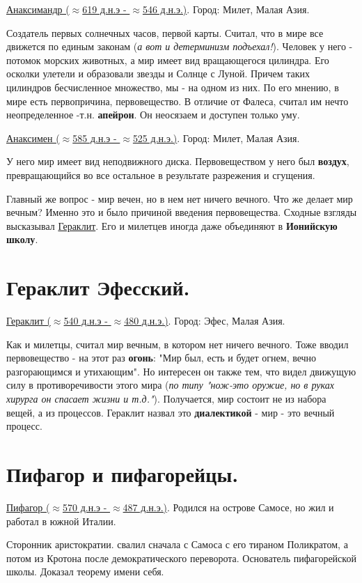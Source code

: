 \underline{Анаксимандр ($\approx$619 д.н.э - $\approx$546 д.н.э.)}. Город: Милет, Малая Азия.

Создатель первых солнечных часов, первой карты.
Считал, что в мире все движется по единым законам (\textit{а вот и детерминизм подъехал!}). Человек у него - потомок морских животных, а мир имеет вид вращающегося цилиндра. Его осколки улетели и образовали звезды и Солнце с Луной. Причем таких цилиндров бесчисленное множество, мы - на одном из них.
По его мнению, в мире есть первопричина, первовещество. В отличие от Фалеса, считал им нечто неопределенное -т.н. \textbf{апейрон}. Он неосязаем и доступен только уму.

\underline{Анаксимен ($\approx$585 д.н.э - $\approx$525 д.н.э.)}. Город: Милет, Малая Азия.

У него мир имеет вид неподвижного диска. 
Первовеществом у него был \textbf{воздух}, превращающийся во все остальное в результате разрежения и сгущения.

Главный же вопрос - мир вечен, но в нем нет ничего вечного. Что же делает мир вечным? Именно это и было причиной введения первовещества. Сходные взгляды высказывал \underline{Гераклит}. Его и милетцев иногда даже объединяют в \textbf{Ионийскую школу}.

\section{Гераклит Эфесский.}
\underline{Гераклит ($\approx$540 д.н.э - $\approx$480 д.н.э.)}. Город: Эфес, Малая Азия.

Как и милетцы, считал мир вечным, в котором нет ничего вечного. Тоже вводил первовещество - на этот раз \textbf{огонь}: "Мир был, есть и будет огнем, вечно разгорающимся и утихающим". Но интересен он также тем, что видел движущую силу в противоречивости этого мира (\textit{по типу "нож-это оружие, но в руках хирурга он спасает жизни и т.д."}). Получается, мир состоит не из набора вещей, а из процессов. Гераклит назвал это \textbf{диалектикой} - мир - это вечный процесс. 

\section{Пифагор и пифагорейцы.}
\underline{Пифагор ($\approx$570 д.н.э - $\approx$487 д.н.э.)}. Родился на острове Самосе, но жил и работал в южной Италии.

Сторонник аристократии. свалил сначала с Самоса с его тираном Поликратом, а потом из Кротона после демократического переворота.
Основатель пифагорейской школы. Доказал теорему имени себя.

